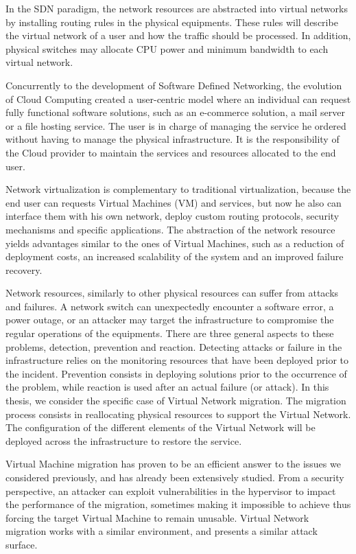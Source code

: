 In the SDN paradigm, the network resources are abstracted into virtual networks by installing routing rules in the physical equipments. These rules will describe the virtual network of a user and how the traffic should be processed. In addition, physical switches may allocate CPU power and minimum bandwidth to each virtual network.

Concurrently to the development of Software Defined Networking, the evolution of Cloud Computing created a user-centric model where an individual can request fully functional software solutions, such as an e-commerce solution, a mail server or a file hosting service. The user is in charge of managing the service he ordered without having to manage the physical infrastructure.
It is the responsibility of the Cloud provider to maintain the services and resources allocated to the end user.

Network virtualization is complementary to traditional virtualization, because the end user can requests Virtual Machines (VM) and services, but now he also can interface them with his own network, deploy custom routing protocols, security mechanisms and specific applications. The abstraction of the network resource yields advantages similar to the ones of Virtual Machines, such as a reduction of deployment costs, an increased scalability of the system and an improved failure recovery.

Network resources, similarly to other physical resources can suffer from attacks and failures. A network switch can unexpectedly encounter a software error, a power outage, or an attacker may target the infrastructure to compromise the regular operations of the equipments. There are three general aspects to these problems, detection, prevention and reaction. Detecting attacks or failure in the infrastructure relies on the monitoring resources that have been deployed prior to the incident. Prevention consists in deploying solutions prior to the occurrence of the problem, while reaction is used after an actual failure (or attack).
In this thesis, we consider the specific case of Virtual Network migration.
The migration process consists in reallocating physical resources to support the Virtual Network.
The configuration of the different elements of the Virtual Network will be deployed across the infrastructure to restore the service.

Virtual Machine migration has proven to be an efficient answer to the issues we considered previously, and has already been extensively studied. From a security perspective, an attacker can exploit vulnerabilities in the hypervisor to impact the performance of the migration, sometimes making it impossible to achieve thus forcing the target Virtual Machine to remain unusable.
Virtual Network migration works with a similar environment, and presents a similar attack surface.

